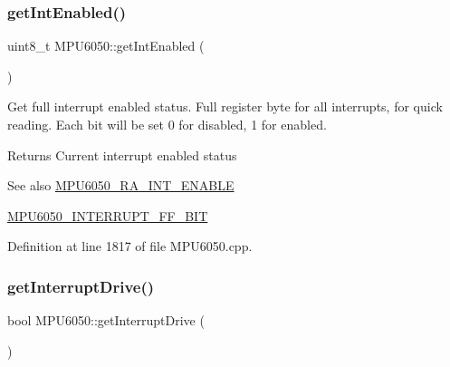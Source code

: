 \subsubsection{\texorpdfstring{getIntEnabled()}{getIntEnabled()}}
{\footnotesize\ttfamily uint8\+\_\+t M\+P\+U6050\+::get\+Int\+Enabled (\begin{DoxyParamCaption}{ }\end{DoxyParamCaption})}

Get full interrupt enabled status. Full register byte for all interrupts, for quick reading. Each bit will be set 0 for disabled, 1 for enabled. \begin{DoxyReturn}{Returns}
Current interrupt enabled status 
\end{DoxyReturn}
\begin{DoxySeeAlso}{See also}
\mbox{\hyperlink{MPU6050_8h_a1de9d9557aa7420c746721999df4a377}{M\+P\+U6050\+\_\+\+R\+A\+\_\+\+I\+N\+T\+\_\+\+E\+N\+A\+B\+LE}} 

\mbox{\hyperlink{MPU6050_8h_a95b5ee3f5f796515c31f0b59f9ce0019}{M\+P\+U6050\+\_\+\+I\+N\+T\+E\+R\+R\+U\+P\+T\+\_\+\+F\+F\+\_\+\+B\+IT}} 
\end{DoxySeeAlso}


Definition at line 1817 of file M\+P\+U6050.\+cpp.


\begin{DoxyCode}{0}

\end{DoxyCode}
\mbox{\label{classMPU6050_af66e6c7b1885dcf452e73371790fddfd}} 
\subsubsection{\texorpdfstring{getInterruptDrive()}{getInterruptDrive()}}
{\footnotesize\ttfamily bool M\+P\+U6050\+::get\+Interrupt\+Drive (\begin{DoxyParamCaption}{ }\end{DoxyParamCaption})}


